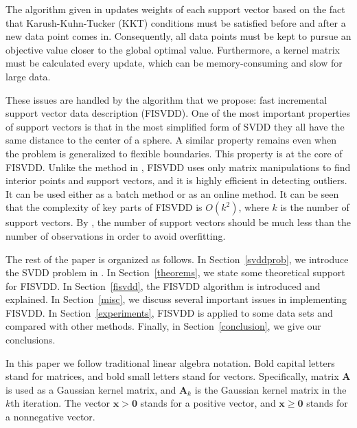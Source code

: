 \documentclass{article}
\newcommand{\sref}[1]{Section~\ref{#1}}
\numberwithin{equation}{section}
\begin{document}
The algorithm given in \citet{laskov2006incremental} updates weights of each support vector based on the fact that Karush-Kuhn-Tucker (KKT) conditions must be satisfied before and after a new data point comes in. Consequently, all data points must be kept to pursue an objective value closer to the global optimal value. Furthermore, a kernel matrix must be calculated every update, which can be memory-consuming and slow for large data. 

These issues are handled by the algorithm that we propose: fast incremental support vector data description (FISVDD). One of the most important properties of support vectors is that in the most simplified form of SVDD they all have the same distance to the center of a sphere. A similar property remains even when the problem is generalized to flexible boundaries. This property is at the core of FISVDD. Unlike the method in \citet{laskov2006incremental}, FISVDD uses only matrix manipulations to find interior points and support vectors, and it is highly efficient in detecting outliers. It can be used either as a batch method or as an online method. It can be seen that the complexity of key parts of FISVDD is $O(k^2)$, where $k$ is the number of support vectors. By \citet{kakde2017peak}, the number of support vectors should be much less than the number of observations in order to avoid overfitting.

The rest of the paper is organized as follows. In \sref{svddprob}, we introduce the SVDD problem in \citet{tax2004support}. In \sref{theorems}, we state some theoretical support for FISVDD. In \sref{fisvdd}, the FISVDD algorithm is introduced and explained. In \sref{misc}, we discuss several important issues in implementing FISVDD. In \sref{experiments}, FISVDD is applied to some data sets and compared with other methods. Finally, in \sref{conclusion}, we give our conclusions.

In this paper we follow traditional linear algebra notation. Bold capital letters stand for matrices, and bold small letters stand for vectors. Specifically, matrix $\mathbf{A}$ is used as a Gaussian kernel matrix, and $\mathbf{A}_{k}$ is the Gaussian kernel matrix in the $k$th iteration. The vector $\mathbf{x}>\mathbf{0}$ stands for a positive vector, and $\mathbf{x}\ge \mathbf{0}$ stands for a nonnegative vector.
\end{document}

